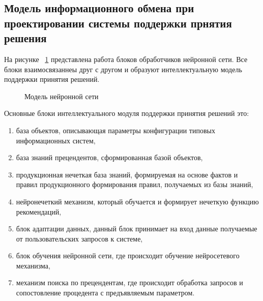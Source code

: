 \subsection{Модель информационного обмена при проектировании системы поддержки прнятия решения}\label{sec:ch3/sec2/sub1}
На рисунке ~\cref{fig:NNmodel} представлена работа блоков обработчиков нейронной сети. Все блоки взаимосвязаннеы друг с другом и образуют интеллектуальную модель поддержки принятия решений.
\begin{figure}[ht]
    \caption{Модель нейронной сети}\label{fig:NNmodel}
\end{figure}

Основные блоки интеллектуального модуля поддержки принятия решений это:
\begin{enumerate}
\item база объектов, описывающая параметры конфигурации типовых информационных систем,
\item база знаний прецендентов, сформированная базой объектов,
\item продукционная нечеткая база знаний, формируемая на основе фактов и правил продукционного формирования правил, получаемых из базы знаний,
\item нейронечеткий механизм, который обучается и формирует  нечеткую функцию рекомендаций,
\item блок адаптации данных, данный блок принимает на вход данные получаемые от пользовательских запросов к системе,
\item блок обучения нейронной сети, где происходит обучение нейросетевого механизма,
\item механизм поиска по прецендентам, где происходит обработка запросов и сопостовление процедента с предъявляемым параметром.
\end{enumerate}

